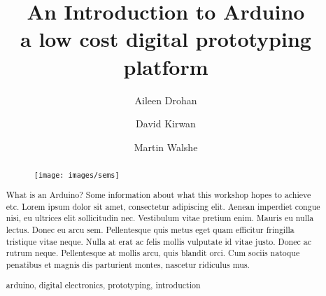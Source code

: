 \documentclass[runningheads,a4paper]{llncs}
\newcommand{\keywords}[1]{\par\addvspace\baselineskip
\noindent\keywordname\enspace\ignorespaces#1}
\begin{document}
\mainmatter  %

\title{An Introduction to Arduino \\a low cost digital prototyping platform}

%

%
%
\author{Aileen Drohan%
\and David Kirwan \and Martin Walshe}
%

%

%
%
\maketitle

%
\begin{abstract}
\begin{figure}
	\centering
	\texttt{[image: images/sems]}
\end{figure}
What is an Arduino? Some information about what this workshop hopes to achieve etc. Lorem ipsum dolor sit amet, consectetur adipiscing elit. Aenean imperdiet congue nisi, eu ultrices elit sollicitudin nec. Vestibulum vitae pretium enim. Mauris eu nulla lectus. Donec eu arcu sem. Pellentesque quis metus eget quam efficitur fringilla tristique vitae neque. Nulla at erat ac felis mollis vulputate id vitae justo. Donec ac rutrum neque. Pellentesque at mollis arcu, quis blandit orci. Cum sociis natoque penatibus et magnis dis parturient montes, nascetur ridiculus mus.
\keywords{arduino, digital electronics, prototyping, introduction}
\end{abstract}
%
\end{document}
